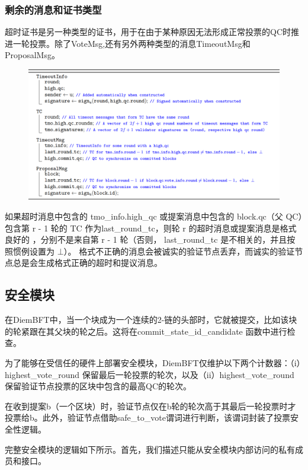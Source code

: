 \subsubsection{剩余的消息和证书类型}

超时证书是另一种类型的证书，用于在由于某种原因无法形成正常投票的QC时推进一轮投票。除了VoteMsg,还有另外两种类型的消息TimeoutMsg和ProposalMsg。

\begin{figure}[H]
    \centering
    \includegraphics[width=12cm]{figures/code5.png}
\end{figure}

如果超时消息中包含的 tmo\_info.high\_qc 或提案消息中包含的 block.qc（父 QC）包含第 r - 1 轮的 TC 作为last\_round\_tc，则轮 r 的超时消息或提案消息是格式良好的 ，分别不是来自第 r - 1 轮（否则， last\_round\_tc 是不相关的，并且按照惯例设置为 $\bot$）。 格式不正确的消息会被诚实的验证节点丢弃，而诚实的验证节点总是会生成格式正确的超时和提议消息。

\subsection{安全模块}

在DiemBFT中，当一个块成为一个连续的2-链的头部时，它就被提交，比如该块的轮紧跟在其父块的轮之后。这将在commit\_state\_id\_candidate 函数中进行检查。

为了能够在受信任的硬件上部署安全模块，DiemBFT仅维护以下两个计数器：（i）highest\_vote\_round 保留最后一轮投票的轮次，以及（ii）highest\_vote\_round 保留验证节点投票的区块中包含的最高QC的轮次。

在收到提案b（一个区块）时，验证节点仅在b轮的轮次高于其最后一轮投票时才投票给b。此外，验证节点借助safe\_to\_vote谓词进行判断，该谓词封装了投票安全性逻辑。

完整安全模块的逻辑如下所示。首先，我们描述只能从安全模块内部访问的私有成员和接口。

